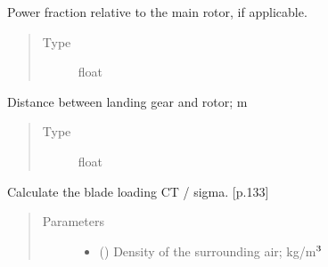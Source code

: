 \documentclass[letterpaper,10pt,english]{sphinxmanual}
\begin{document}
\begin{fulllineitems}
\begin{fulllineitems}
\begin{quote}
\begin{description}
\end{description}\end{quote}

\end{fulllineitems}


\begin{fulllineitems}
\label{\detokenize{modules/rotor:rotor.Rotor.power_fraction}}
\sphinxAtStartPar
Power fraction relative to the main rotor, if applicable.
\begin{quote}\begin{description}
\item[{Type}] \leavevmode
\sphinxAtStartPar
float

\end{description}\end{quote}

\end{fulllineitems}


\begin{fulllineitems}
\label{\detokenize{modules/rotor:rotor.Rotor.installation_height}}
\sphinxAtStartPar
Distance between landing gear and rotor; m
\begin{quote}\begin{description}
\item[{Type}] \leavevmode
\sphinxAtStartPar
float

\end{description}\end{quote}

\end{fulllineitems}


\begin{fulllineitems}
\label{\detokenize{modules/rotor:rotor.Rotor.get_blade_loading}}
\sphinxAtStartPar
Calculate the blade loading CT / sigma. {[}p.133{]}
\begin{quote}\begin{description}
\item[{Parameters}] \leavevmode\begin{itemize}
\item {} 
\sphinxAtStartPar
{} () \textendash{} Density of the surrounding air; kg/m\(\sp{\text{3}}\)


\end{itemize}
\end{description}
\end{quote}
\end{fulllineitems}
\end{fulllineitems}
\end{document}
